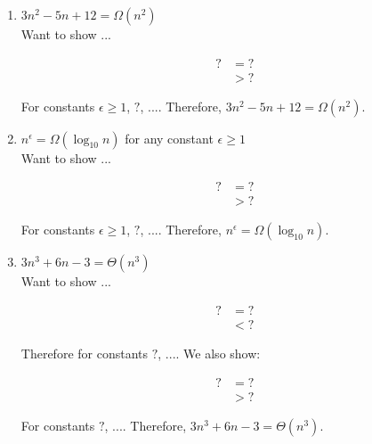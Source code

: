 \documentclass[11pt, letter]{article}
\begin{document}
\begin{enumerate}
    \item $3n^2 - 5n + 12 = \Omega(n^2)$\\

    Want to show ...
    
    \begin{equation*}
        \begin{split}
            ? &= ?\\
            &> ?
        \end{split}
    \end{equation*}
    
    For constants $\epsilon \geq 1$, $?$, $...$. Therefore, $3n^2 - 5n + 12 = \Omega(n^2)$.

    \item $n^\epsilon = \Omega(\log_{10} n)$ for any constant $\epsilon \geq 1 $\\

    Want to show ...
    
    \begin{equation*}
        \begin{split}
            ? &= ?\\
            &> ?
        \end{split}
    \end{equation*}
    
    For constants $\epsilon \geq 1$, $?$, $...$. Therefore, $n^\epsilon = \Omega(\log_{10} n)$.

    \item $3n^3 + 6n - 3 = \Theta(n^3)$\\

    Want to show ...
    
    \begin{equation*}
        \begin{split}
            ? &= ?\\
            &< ?
        \end{split}
    \end{equation*}
    
    Therefore for constants $?$, $...$. We also show:
    
    \begin{equation*}
        \begin{split}
            ? &= ?\\
            &> ?
        \end{split}
    \end{equation*}
    
    For constants $?$, $...$. Therefore, $3n^3 + 6n - 3 = \Theta(n^3)$.


\end{enumerate}
\end{document}
